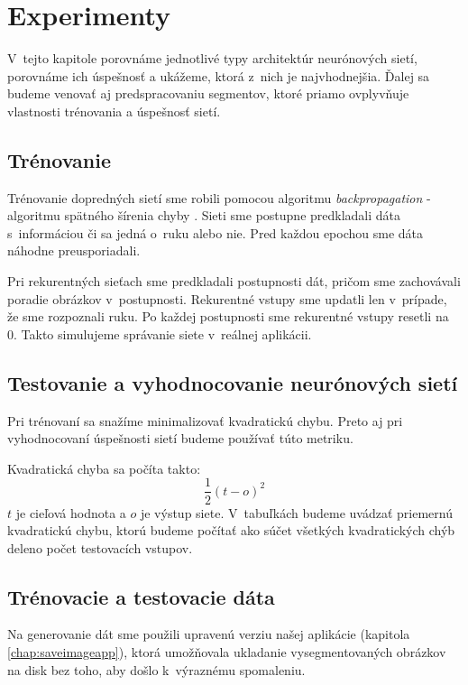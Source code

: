 \chapter{Experimenty}
\label{chap:experiments}

V~tejto kapitole porovnáme jednotlivé typy architektúr neurónových sietí, porovnáme ich úspešnosť a ukážeme, ktorá z~nich je najvhodnejšia. Ďalej sa budeme venovať aj predspracovaniu segmentov, ktoré priamo ovplyvňuje vlastnosti trénovania a úspešnosť sietí.
\bigskip

\section{Trénovanie}

Trénovanie dopredných sietí sme robili pomocou algoritmu \textit{backpropagation} - algoritmu spätného šírenia chyby \cite{haykin1999neural}. Sieti sme postupne predkladali dáta s~informáciou či sa jedná o~ruku alebo nie. Pred každou epochou sme dáta náhodne preusporiadali. 

Pri rekurentných sieťach sme predkladali postupnosti dát, pričom sme zachovávali poradie obrázkov v~postupnosti. Rekurentné vstupy sme updatli len v~prípade, že sme rozpoznali ruku. Po každej postupnosti sme rekurentné vstupy resetli na 0. Takto simulujeme správanie siete v~reálnej aplikácii.

\section{Testovanie a vyhodnocovanie neurónových sietí}
Pri trénovaní sa snažíme minimalizovať kvadratickú chybu. Preto aj pri vyhodnocovaní úspešnosti sietí budeme používať túto metriku.

Kvadratická chyba sa počíta takto: $$\frac{1}{2}(t-o)^2$$
$t$ je cieľová hodnota a $o$ je výstup siete. V~tabuľkách budeme uvádzať priemernú kvadratickú chybu, ktorú budeme počítať ako súčet všetkých kvadratických chýb deleno počet testovacích vstupov. 

\section{Trénovacie a testovacie dáta}
\label{chap:data}

Na generovanie dát sme použili upravenú verziu našej aplikácie (kapitola \ref{chap:saveimageapp}), ktorá umožňovala ukladanie vysegmentovaných obrázkov na disk bez toho, aby došlo k~výraznému spomaleniu. 

